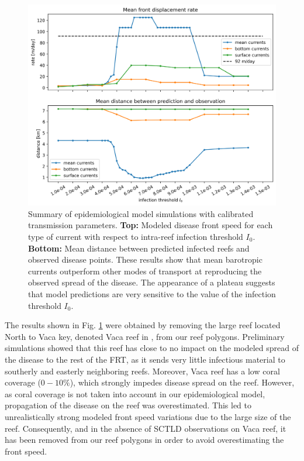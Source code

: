 \documentclass[utf8]{frontiersSCNS}
\begin{document}
\begin{figure}
    \centering
    \includegraphics[width=.8\textwidth]{figures/sctld_validation_corrected.png}
    \caption{Summary of epidemiological model simulations with calibrated transmission parameters. \textbf{Top:} Modeled disease front speed for each type of current with respect to intra-reef infection threshold $I_0$. \textbf{Bottom:} Mean distance between predicted infected reefs and observed disease points. These results show that mean barotropic currents outperform other modes of transport at reproducing the observed spread of the disease. The appearance of a plateau suggests that model predictions are very sensitive to the value of the infection threshold $I_0$.}
    \label{fig:results}
\end{figure}

The results shown in Fig. \ref{fig:results} were obtained by removing the large reef located North to Vaca key, denoted Vaca reef in \cite{frys20}, from our reef polygons. Preliminary simulations showed that this reef has close to no impact on the modeled spread of the disease to the rest of the FRT, as it sends very little infectious material to southerly and easterly neighboring reefs. Moreover, Vaca reef has a low coral coverage ($0-10\%$), which strongly impedes disease spread on the reef. However, as coral coverage is not taken into account in our epidemiological model, propagation of the disease on the reef was overestimated. This led to unrealistically strong modeled front speed variations due to the large size of the reef. Consequently, and in the absence of SCTLD observations on Vaca reef, it has been removed from our reef polygons in order to avoid overestimating the front speed.
\end{document}
